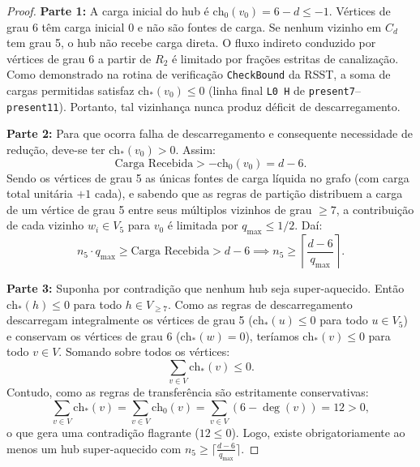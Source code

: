 \documentclass[11pt,a4paper]{article}
\theoremstyle{plain}
\theoremstyle{definition}
\begin{document}
\begin{proof}
\textbf{Parte 1:} A carga inicial do hub é $\text{ch}_0(v_0) = 6 - d \le -1$. Vértices de grau 6 têm carga inicial 0 e não são fontes de carga. Se nenhum vizinho em $C_d$ tem grau 5, o hub não recebe carga direta. O fluxo indireto conduzido por vértices de grau 6 a partir de $R_2$ é limitado por frações estritas de canalização. Como demonstrado na rotina de verificação \texttt{CheckBound} da RSST, a soma de cargas permitidas satisfaz $\text{ch}_*(v_0) \le 0$ (linha final \texttt{L0 H} de \texttt{present7}--\texttt{present11}). Portanto, tal vizinhança nunca produz déficit de descarregamento.

\textbf{Parte 2:} Para que ocorra falha de descarregamento e consequente necessidade de redução, deve-se ter $\text{ch}_*(v_0) > 0$. Assim:
\begin{equation}
\text{Carga Recebida} > -\text{ch}_0(v_0) = d - 6.
\end{equation}
Sendo os vértices de grau 5 as únicas fontes de carga líquida no grafo (com carga total unitária $+1$ cada), e sabendo que as regras de partição distribuem a carga de um vértice de grau 5 entre seus múltiplos vizinhos de grau $\ge 7$, a contribuição de cada vizinho $w_i \in V_5$ para $v_0$ é limitada por $q_{\max} \le 1/2$. Daí:
\begin{equation}
n_5 \cdot q_{\max} \ge \text{Carga Recebida} > d - 6 \implies n_5 \ge \left\lceil \frac{d - 6}{q_{\max}} \right\rceil.
\end{equation}

\textbf{Parte 3:} Suponha por contradição que nenhum hub seja super-aquecido. Então $\text{ch}_*(h) \le 0$ para todo $h \in V_{\ge 7}$. Como as regras de descarregamento descarregam integralmente os vértices de grau 5 ($\text{ch}_*(u) \le 0$ para todo $u \in V_5$) e conservam os vértices de grau 6 ($\text{ch}_*(w) = 0$), teríamos $\text{ch}_*(v) \le 0$ para todo $v \in V$. Somando sobre todos os vértices:
\begin{equation}
\sum_{v \in V} \text{ch}_*(v) \le 0.
\end{equation}
Contudo, como as regras de transferência são estritamente conservativas:
\begin{equation}
\sum_{v \in V} \text{ch}_*(v) = \sum_{v \in V} \text{ch}_0(v) = \sum_{v \in V} (6 - \deg(v)) = 12 > 0,
\end{equation}
o que gera uma contradição flagrante ($12 \le 0$). Logo, existe obrigatoriamente ao menos um hub super-aquecido com $n_5 \ge \lceil \frac{d - 6}{q_{\max}} \rceil$.
\end{proof}
\end{document}
